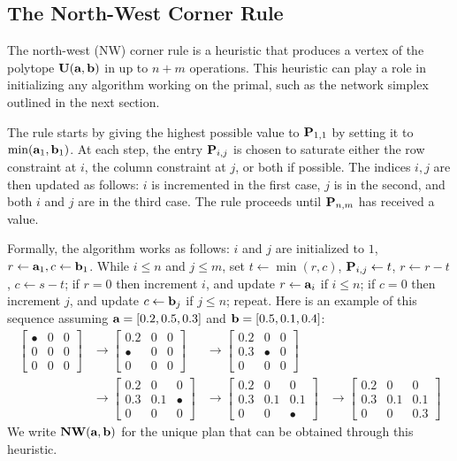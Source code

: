 \subsection{The North-West Corner Rule}\label{subsec-northwest}
The north-west (NW) corner rule is a heuristic that produces a vertex of the polytope $\CouplingsD(\a,\b)$ in up to $n+m$ operations. This heuristic can play a role in initializing any algorithm working on the primal, such as the network simplex outlined in the next section. 

The rule starts by giving the highest possible value to $\P_{1,1}$ by setting it to $\min(\a_1,\b_1)$. At each step, the entry $\P_{i,j}$ is chosen to saturate either the row constraint at $i$, the column constraint at $j$, or both if possible. The indices $i,j$ are then updated as follows: $i$ is incremented in the first case, $j$ is in the second, and both $i$ and $j$ are in the third case. The rule proceeds until $\P_{n,m}$ has received a value. 

Formally, the algorithm works as follows: $i$ and $j$ are initialized to $1$, $r\leftarrow\a_1,c\leftarrow \b_1$. While $i\leq n$ and $j\leq m$, set $t\leftarrow \min(r,c)$, $\P_{i,j}\leftarrow t$, $r\leftarrow r-t$, $c\leftarrow s-t$; if $r=0$ then increment $i$, and update $r\leftarrow\a_i$ if $i\leq n$; if $c=0$ then increment $j$, and update $c\leftarrow \b_j$ if $j\leq n$; repeat. Here is an example of this sequence assuming $\a=[0.2,0.5,0.3]$  and $\b=[0.5,0.1,0.4]$:
$$\begin{aligned}\begin{bmatrix} \bullet & 0 & 0 \\ 0 & 0 & 0 \\ 0& 0 & 0\end{bmatrix} &\rightarrow \begin{bmatrix} 0.2 & 0 & 0 \\ \bullet & 0 & 0 \\ 0& 0 & 0\end{bmatrix} &\rightarrow \begin{bmatrix} 0.2 & 0 & 0 \\ 0.3 & \bullet & 0 \\ 0& 0 & 0\end{bmatrix}\\ &\rightarrow \begin{bmatrix} 0.2 & 0 & 0 \\ 0.3 &0.1 &\bullet \\ 0& 0 & 0\end{bmatrix} &\rightarrow \begin{bmatrix} 0.2 & 0 & 0 \\ 0.3 &0.1 &0.1 \\ 0& 0 & \bullet\end{bmatrix} & \rightarrow \begin{bmatrix} 0.2 & 0 & 0 \\ 0.3 &0.1 &0.1 \\ 0& 0 & 0.3\end{bmatrix}\end{aligned}$$
We write $\NW(\a,\b)$ for the unique plan that can be obtained through this heuristic. 

